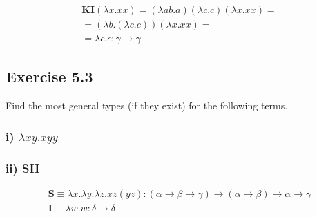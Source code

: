 \documentclass[11pt]{article}
\begin{document}
\begin{gather*}
\mathbf{KI}(\lambda x.xx) = (\lambda ab.a) (\lambda c.c) (\lambda x.xx) = \\
= (\lambda b.(\lambda c.c))(\lambda x.xx) = \\
= \lambda c.c : \gamma \rightarrow \gamma 
\end{gather*}


\subsection*{Exercise 5.3}
Find the most general types (if they exist) for the following terms.

\subsubsection*{i) $\lambda xy.xyy$}

\begin{center}



\DP
\end{center}


\subsubsection*{ii) SII}

\begin{center}


\DP
\end{center}

\begin{gather*}
\mathbf{S} \equiv  \lambda x. \lambda y. \lambda z. xz(yz) : (\alpha \rightarrow \beta \rightarrow \gamma) \rightarrow (\alpha \rightarrow \beta) \rightarrow \alpha \rightarrow \gamma \\
\mathbf{I} \equiv \lambda w.w : \delta \rightarrow \delta
\end{gather*}
\end{document}
